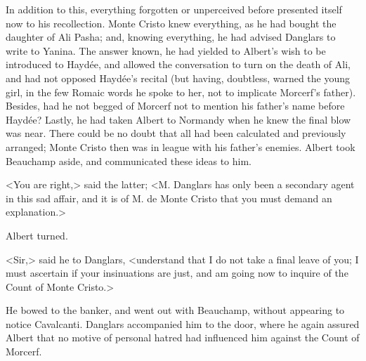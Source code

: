  In addition to this, everything forgotten or unperceived before presented itself now to his recollection. Monte Cristo knew everything, as he had bought the daughter of Ali Pasha; and, knowing everything, he had advised Danglars to write to Yanina. The answer known, he had yielded to Albert's wish to be introduced to Haydée, and allowed the conversation to turn on the death of Ali, and had not opposed Haydée's recital (but having, doubtless, warned the young girl, in the few Romaic words he spoke to her, not to implicate Morcerf's father). Besides, had he not begged of Morcerf not to mention his father's name before Haydée? Lastly, he had taken Albert to Normandy when he knew the final blow was near. There could be no doubt that all had been calculated and previously arranged; Monte Cristo then was in league with his father's enemies. Albert took Beauchamp aside, and communicated these ideas to him. 

 <You are right,> said the latter; <M. Danglars has only been a secondary agent in this sad affair, and it is of M. de Monte Cristo that you must demand an explanation.> 

 Albert turned. 

 <Sir,> said he to Danglars, <understand that I do not take a final leave of you; I must ascertain if your insinuations are just, and am going now to inquire of the Count of Monte Cristo.> 

 He bowed to the banker, and went out with Beauchamp, without appearing to notice Cavalcanti. Danglars accompanied him to the door, where he again assured Albert that no motive of personal hatred had influenced him against the Count of Morcerf. 